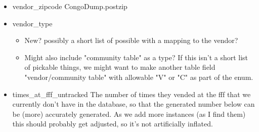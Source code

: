 \documentclass[captions=tablesignature]{scrartcl}
\begin{document}
\begin{itemize}
\item vendor\_zipcode
\label{sec-2-1-15}
CongoDump.postzip

\item vendor\_type
\label{sec-2-1-16}
\begin{itemize}
\item New? possibly a short list of possible with a mapping to the
vendor?
\item Might also include "community table" as a type?  If this isn't a
short list of pickable things, we might want to make another
table field "vendor/community table" with allowable "V" or "C"
as part of the enum.
\end{itemize}

\item times\_at\_fff\_untracked
\label{sec-2-1-17}
The number of times they vended at the fff that we currently don't
have in the database, so that the generated number below can be
(more) accurately generated.  As we add more instances (as I find
them) this should probably get adjusted, so it's not artificially
inflated.
\end{itemize}
\end{document}

